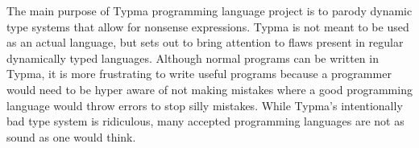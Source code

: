 \documentclass[10pt,twocolumn]{article}
\begin{document}
The main purpose of Typma programming language project is to parody dynamic type systems that allow for nonsense expressions. Typma is not meant to be used as an actual language, but sets out to bring attention to flaws present in regular dynamically typed languages. Although normal programs can be written in Typma, it is more frustrating to write useful programs because a programmer would need to be hyper aware of not making mistakes where a good programming language would throw errors to stop silly mistakes. While Typma's intentionally bad type system is ridiculous, many accepted programming languages are not as sound as one would think.
\printbibliography 
\end{document}
